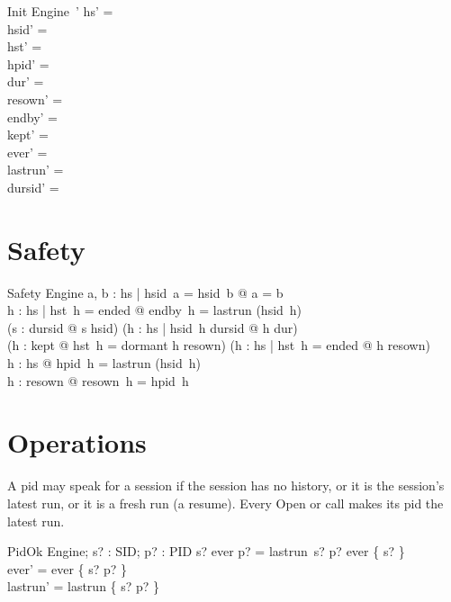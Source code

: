 \documentclass[a4paper,10pt,fleqn]{article}
\begin{document}
\begin{schema}{Init}
  Engine~'
\where
  hs' = \emptyset \\
  hsid' = \emptyset \\
  hst' = \emptyset \\
  hpid' = \emptyset \\
  dur' = \emptyset \\
  resown' = \emptyset \\
  endby' = \emptyset \\
  kept' = \emptyset \\
  ever' = \emptyset \\
  lastrun' = \emptyset \\
  dursid' = \emptyset
\end{schema}

\section{Safety}

\begin{schema}{Safety}
  Engine
\where
  \forall a, b : hs | hsid~a = hsid~b @ a = b \\
  \forall h : hs | hst~h = ended @ endby~h = lastrun (hsid~h) \\
  (\forall s : dursid @ s \in \ran hsid) \land
    (\forall h : hs | hsid~h \in dursid @ h \in dur) \\
  (\forall h : kept @ hst~h = dormant \land h \in \dom resown) \land
    (\forall h : hs | hst~h = ended @ h \notin \dom resown) \\
  \forall h : hs @ hpid~h = lastrun (hsid~h) \\
  \forall h : \dom resown @ resown~h = hpid~h
\end{schema}

\section{Operations}

A pid may speak for a session if the session has no history, or it is the
session's latest run, or it is a fresh run (a resume).  Every Open or call
makes its pid the latest run.

\begin{schema}{PidOk}
  \Delta Engine; s? : SID; p? : PID
\where
  s? \notin \dom ever \lor p? = lastrun~s? \lor p? \notin ever \limg \{ s? \} \rimg \\
  ever' = ever \cup \{ s? \mapsto p? \} \\
  lastrun' = lastrun \oplus \{ s? \mapsto p? \}
\end{schema}
\end{document}
